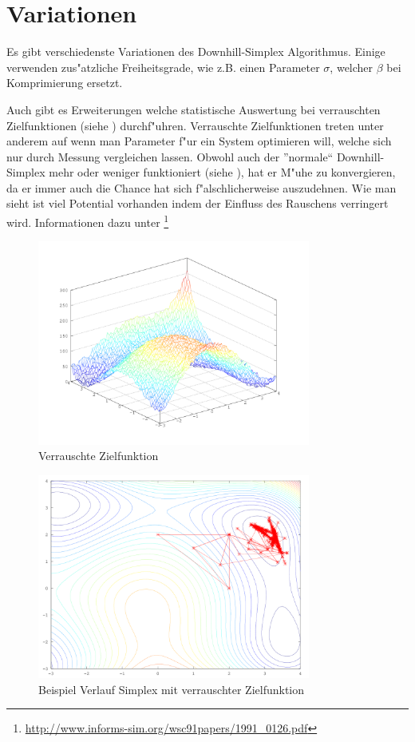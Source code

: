 \section{Variationen}
Es gibt verschiedenste Variationen des Downhill-Simplex Algorithmus.
Einige verwenden zus"atzliche Freiheitsgrade, wie z.B. einen Parameter
$\sigma$, welcher $\beta$ bei Komprimierung ersetzt.

Auch gibt es Erweiterungen welche statistische Auswertung bei verrauschten
Zielfunktionen (siehe ) durchf"uhren.
Verrauschte Zielfunktionen treten unter anderem auf wenn man Parameter
f"ur ein System optimieren will, welche sich nur durch Messung vergleichen
lassen. Obwohl auch der ''normale`` Downhill-Simplex mehr oder weniger
funktioniert (siehe ), hat er M"uhe zu
konvergieren, da er immer auch die Chance hat sich f"alschlicherweise
auszudehnen. Wie man sieht ist viel Potential vorhanden indem der
Einfluss des Rauschens verringert wird.
Informationen dazu unter \footnote{\url{http://www.informs-sim.org/wsc91papers/1991_0126.pdf}}
\begin{figure}[h]
\centering
\includegraphics[width=0.8\textwidth]{downhill/himmelblauoverview.png}
\caption{Verrauschte Zielfunktion}
\label{fig:downhillRauschen1}
\end{figure}

\begin{figure}[h]
\centering
\includegraphics[width=0.8\textwidth]{downhill/himmelblauall.png}
\caption{Beispiel Verlauf Simplex mit verrauschter Zielfunktion}
\label{fig:downhillRauschen2}
\end{figure}
